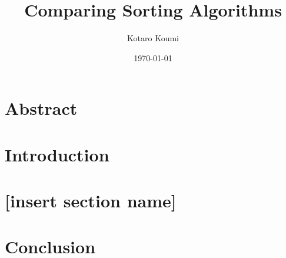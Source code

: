 \documentclass[12 pt]{article}
\title{Comparing Sorting Algorithms}
\author{Kotaro Koumi}
\date{\today}
\begin{document}
   
\maketitle

\section{Abstract}


\section{Introduction}

\section{[insert section name]}

\section{Conclusion}
\end{document}
